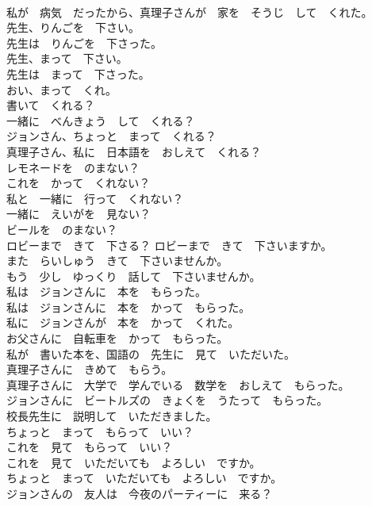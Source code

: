 \documentclass[8pt]{extreport}
\begin{document}
\begin{CJK}{UTF8}{min}
\\	私が　病気　だったから、真理子さんが　家を　そうじ　して　くれた。	
\\	先生、りんごを　下さい。	
\\	先生は　りんごを　下さった。	
\\	先生、まって　下さい。	
\\	先生は　まって　下さった。	
\\	おい、まって　くれ。	
\\	書いて　くれる？	
\\	一緒に　べんきょう　して　くれる？	
\\	ジョンさん、ちょっと　まって　くれる？	
\\	真理子さん、私に　日本語を　おしえて　くれる？	
\\	レモネードを　のまない？	
\\	これを　かって　くれない？	
\\	私と　一緒に　行って　くれない？	
\\	一緒に　えいがを　見ない？	
\\	ビールを　のまない？	
\\	ロビーまで　きて　下さる？ ロビーまで　きて　下さいますか。	
\\	また　らいしゅう　きて　下さいませんか。	
\\	もう　少し　ゆっくり　話して　下さいませんか。	
\\	私は　ジョンさんに　本を　もらった。	
\\	私は　ジョンさんに　本を　かって　もらった。	
\\	私に　ジョンさんが　本を　かって　くれた。	
\\	お父さんに　自転車を　かって　もらった。	
\\	私が　書いた本を、国語の　先生に　見て　いただいた。	
\\	真理子さんに　きめて　もらう。	
\\	真理子さんに　大学で　学んでいる　数学を　おしえて　もらった。	
\\	ジョンさんに　ビートルズの　きょくを　うたって　もらった。	
\\	校長先生に　説明して　いただきました。	
\\	ちょっと　まって　もらって　いい？	
\\	これを　見て　もらって　いい？	
\\	これを　見て　いただいても　よろしい　ですか。	
\\	ちょっと　まって　いただいても　よろしい　ですか。	
\\	ジョンさんの　友人は　今夜のパーティーに　来る？	

\end{CJK}
\end{document}

